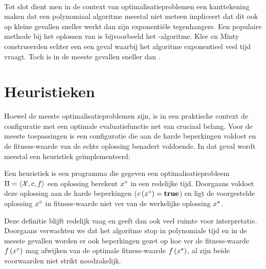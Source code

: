 \paragraph{}
Tot slot dient men in de context van optimalisatieproblemen een kanttekening maken dat een polynomiaal algoritme meestal niet meteen impliceert dat dit ook op kleine gevallen sneller werkt dan zijn exponenti\"ele tegenhangers. Een populaire methode bij het oplossen van  is bijvoorbeeld het -algoritme. Klee en Minty\cite{klee:1972} construeerden echter een een geval waarbij het algoritme exponentieel veel tijd vraagt. Toch is  in de meeste gevallen sneller dan .

\section{Heuristieken}

Hoewel de meeste optimalisatieproblemen  zijn, is in een praktische context de configuratie met een optimale evaluatiefunctie net van cruciaal belang. Voor de meeste toepassingen is een configuratie die aan de harde beperkingen voldoet en de fitness-waarde van de echte oplossing benadert voldoende. In dat geval wordt meestal een heuristiek ge\"implementeerd:

\begin{definition}[Heuristiek]
Een heuristiek is een programma die gegeven een optimalisatieprobleem $\Pi=\left\langle \mathcal{X},c,f\right\rangle$ een oplossing berekent $x^{\circ}$ in een redelijke tijd. Doorgaans voldoet deze oplossing aan de harde beperkingen ($c\left(x^{\circ}\right)=\mbox{\textbf{true}}$) en ligt de voorgestelde oplossing $x^{\circ}$ in fitness-waarde niet ver van de werkelijke oplossing $x^{\star}$.
\end{definition}

Deze definitie blijft redelijk vaag en geeft dan ook veel ruimte voor interpretatie. Doorgaans verwachten we dat het algoritme stop in polynomiale tijd en in de meeste gevallen worden er ook beperkingen gezet op hoe ver de fitness-waarde $f\left(x^{\circ}\right)$ mag afwijken van de optimale fitness-waarde $f\left(x^{\star}\right)$, al zijn beide voorwaarden niet strikt noodzakelijk.


